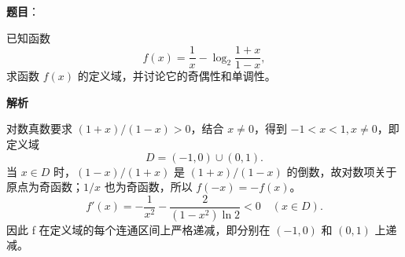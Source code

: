 \begin{answer}

\textbf{题目}：

已知函数
\nopagebreak[4]
\[
    f(x)=\frac1x-\log_2\frac{1+x}{1-x},
\]
    求函数 \(f(x)\) 的定义域，并讨论它的奇偶性和单调性。

\textbf{解析}

对数真数要求 \((1+x)/(1-x)>0\)，结合 \(x\ne0\)，得到 \(-1<x<1,x\ne0\)，即定义域
\nopagebreak[4]
\[
D=(-1,0)\cup(0,1).
\]
当 \(x\in D\) 时，\((1-x)/(1+x)\) 是 \((1+x)/(1-x)\) 的倒数，故对数项关于原点为奇函数；\(1/x\) 也为奇函数，所以 \(f(-x)=-f(x)\)。
\nopagebreak[4]
\[
f'(x)=-\frac1{x^2}-\frac{2}{(1-x^2)\ln2}<0\quad(x\in D).
\]
因此 f 在定义域的每个连通区间上严格递减，即分别在 \((-1,0)\) 和 \((0,1)\) 上递减。


\end{answer}
